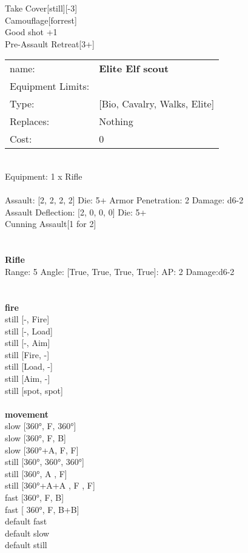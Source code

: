 \noindent Take Cover[still][-3]\\ 
Camouflage[forrest]\\ 
Good shot +1\\ 
Pre-Assault Retreat[3+]\\ 


\noindent
\begin{tabular}{ll}
name: &{\bf Elite Elf scout } \\
Equipment Limits: & \\
Type: &[Bio, Cavalry, Walks, Elite] \\
Replaces: &Nothing \\
Cost: & 0\\
\end{tabular}
\ \\
Equipment: 1 x Rifle \\
\ \\
Assault: [2, 2, 2, 2] Die: 5+ Armor Penetration: 2 Damage: d6-2 \\
Assault Deflection: [2, 0, 0, 0] Die: 5+\\
\indent Cunning Assault[1 for 2]\\ 
 
\ \\

\ \\
{\bf Rifle } \\



Range: 5  Angle: [True, True, True, True]: AP: 2 Damage:d6-2 \\




 
\ \\



\ \\ {\bf fire } \\
still [-, Fire] \\
still [-, Load] \\
still [-, Aim] \\
still [Fire, -] \\
still [Load, -] \\
still [Aim, -] \\
still [spot, spot] \\
\ \\ {\bf movement } \\
slow [360°, F, 360°] \\
slow [360°, F, B] \\
slow [360°+A, F, F] \\
still [360°, 360°, 360°] \\
still [360°, A , F] \\
still [360°+A+A , F , F] \\
fast [360°, F, B] \\
fast [ 360°,  F, B+B] \\
default fast \\
default slow \\
default still \\


